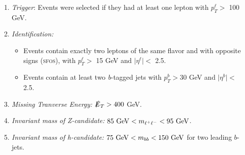 \documentclass[a4paper,11pt]{article}
\providecommand{\tightlist}{%
     \setlength{\itemsep}{0pt}\setlength{\parskip}{0pt}}
\newcommand{\met}{{\slashed{E}_T}}
\begin{document}
\begin{enumerate}
  \tightlist
  \item \emph{Trigger}: Events were selected if they had at least one lepton
    with $p_{T}^\ell >$ 100 GeV. 

  \item \emph{Identification:}

    \begin{itemize}
      \item Events contain exactly two leptons of the same flavor
        and with opposite signs (\textsc{sfos}), with $p_{T}^\ell >$ 15 GeV and
        $\vert\eta^\ell\vert <$ 2.5.
      \item Events contain at least two \emph{b}-tagged jets with
        $p_{T}^b > 30$ GeV and $\vert\eta^b\vert <$ 2.5.
    \end{itemize}

   \item \emph{Missing Tranverse Energy:}  $\met> 400$ GeV.

 \item \emph{Invariant mass of Z-candidate:}  $85\ {\rm GeV}<m_{\ell^{+}\ell^{-}}<95\ {\rm GeV}$.

  \item \emph{Invariant mass of h-candidate:} $75\ {\rm GeV}<m_{bb}<150\ {\rm GeV}$ for two leading $b$-jets.



\end{enumerate}
\end{document}
